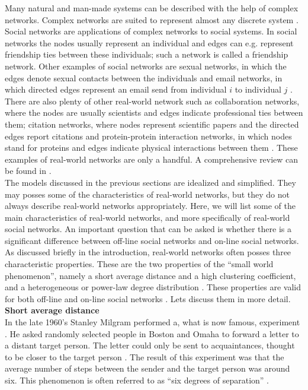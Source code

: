\documentclass[11 pt , letterpaper , twoside , openright]{book}
\begin{document}
Many natural and man-made systems can be described with the help of complex networks. Complex networks are suited to represent almost any discrete system \cite{Costa2008}. Social networks are applications of complex networks to social systems. In social networks the nodes usually represent an individual and edges can e.g. represent friendship ties between these individuals; such a network is called a friendship network. Other examples of social networks are sexual networks, in which the edges denote sexual contacts between the individuals and email networks, in which directed edges represent an email send from individual $i$ to individual $j$ \cite{Costa2008}. There are also plenty of other real-world network such as collaboration networks, where the nodes are usually scientists and edges indicate professional ties between them; citation networks, where nodes represent scientific papers and the directed edges report citations and protein-protein interaction networks, in which nodes stand for proteins and edges indicate physical interactions between them \cite{Costa2008}. These examples of real-world networks are only a handful. A comprehensive review can be found in \cite{Costa2008}.\\
\newline
The models discussed in the previous sections are idealized and simplified. They may posses some of the characteristics of real-world networks, but they do not always describe real-world networks appropriately. Here, we will list some of the main  characteristics of real-world networks, and more specifically of real-world social networks. An important question that can be asked is whether there is a significant difference between off-line social networks and on-line social networks.\\
\newline
As discussed briefly in the introduction, real-world networks often posses three characteristic properties. These are the two properties of the ``small world phenomenon'', namely a short average distance and a high clustering coefficient, and a heterogeneous or power-law degree distribution \cite{RealWorld}. These properties are valid for both off-line and on-line social networks \cite{Zhang2014}. Lets discuss them in more detail.\\
\newline
\textbf{Short average distance}\\
\newline
In the late 1960's Stanley Milgram performed a, what is now famous, experiment \cite{Newman2003}. He asked randomly selected people in Boston and Omaha to forward a letter to a distant target person. The letter could only be sent to acquaintances, thought to be closer to the target person \cite{RealWorld}. The result of this experiment was that the average number of steps between the sender and the target person was around six. This phenomenon is often referred to as ``six degrees of separation'' \cite{RealWorld}.\\
\end{document}
